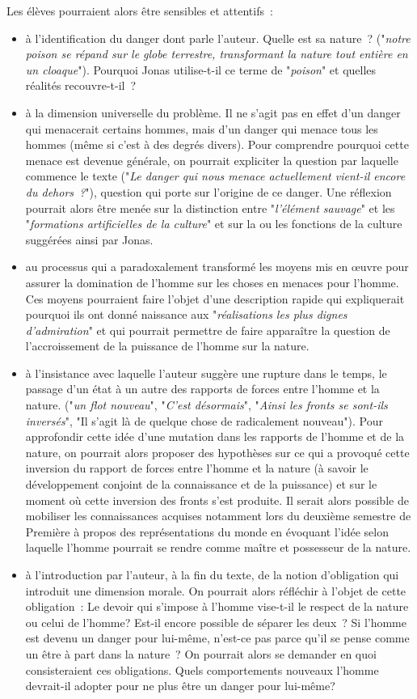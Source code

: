 {Les élèves pourraient alors être sensibles et attentifs~:

\begin{itemize}
\item à l'identification du danger dont parle l'auteur. Quelle est sa nature~? ("\textit{notre poison se
répand sur le globe terrestre, transformant la nature tout entière en un cloaque}"). Pourquoi Jonas
utilise-t-il ce terme de "\textit{poison}" et quelles réalités recouvre-t-il~?
\item à la dimension universelle du problème. Il ne s'agit pas en effet d'un danger qui menacerait
certains hommes, mais d'un danger qui menace tous les hommes (même si c'est à des degrés
divers). Pour comprendre pourquoi cette menace est devenue générale, on pourrait expliciter la
question par laquelle commence le texte ("\textit{Le danger qui nous menace actuellement vient-il
encore du dehors~?}"), question qui porte sur l'origine de ce danger. Une réflexion pourrait alors
être menée sur la distinction entre "\textit{l'élément sauvage}" et les "\textit{formations artificielles de la culture}"
et sur la ou les fonctions de la culture suggérées ainsi par Jonas.
\item au processus qui a paradoxalement transformé les moyens mis en œuvre pour assurer la
domination de l'homme sur les choses en menaces pour l'homme. Ces moyens pourraient faire
l'objet d'une description rapide qui expliquerait pourquoi ils ont donné naissance aux "\textit{réalisations
les plus dignes d'admiration}" et qui pourrait permettre de faire apparaître la question de
l'accroissement de la puissance de l'homme sur la nature.
\item à l'insistance avec laquelle l'auteur suggère une rupture dans le temps, le passage d'un
état à un autre des rapports de forces entre l'homme et la nature. ("\textit{un flot nouveau}", "\textit{C'est
désormais}", "\textit{Ainsi les fronts se sont-ils inversés}", "Il s'agit là de quelque chose de radicalement
nouveau"). Pour approfondir cette idée d'une mutation dans les rapports de l'homme et de la
nature, on pourrait alors proposer des hypothèses sur ce qui a provoqué cette inversion du
rapport de forces entre l'homme et la nature (à savoir le développement conjoint de la
connaissance et de la puissance) et sur le moment où cette inversion des fronts s'est produite. Il
serait alors possible de mobiliser les connaissances acquises notamment lors du deuxième
semestre de Première à propos des représentations du monde en évoquant l'idée selon laquelle
l'homme pourrait se rendre comme maître et possesseur de la nature.
\item à l'introduction par l'auteur, à la fin du texte, de la notion d'obligation qui introduit une
dimension morale. On pourrait alors réfléchir à l'objet de cette obligation~: Le devoir qui s'impose
à l'homme vise-t-il le respect de la nature ou celui de l'homme? Est-il encore possible de séparer
les deux~? Si l'homme est devenu un danger pour lui-même, n'est-ce pas parce qu'il se pense
comme un être à part dans la nature~? On pourrait alors se demander en quoi consisteraient ces
obligations. Quels comportements nouveaux l'homme devrait-il adopter pour ne plus être un
danger pour lui-même?
\end{itemize}

}
